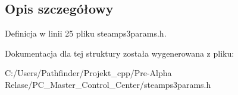 \subsection{Opis szczegółowy}


Definicja w linii 25 pliku steamps3params.\+h.



Dokumentacja dla tej struktury została wygenerowana z pliku\+:\begin{DoxyCompactItemize}
\item 
C\+:/\+Users/\+Pathfinder/\+Projekt\+\_\+cpp/\+Pre-\/\+Alpha Relase/\+P\+C\+\_\+\+Master\+\_\+\+Control\+\_\+\+Center/steamps3params.\+h\end{DoxyCompactItemize}
